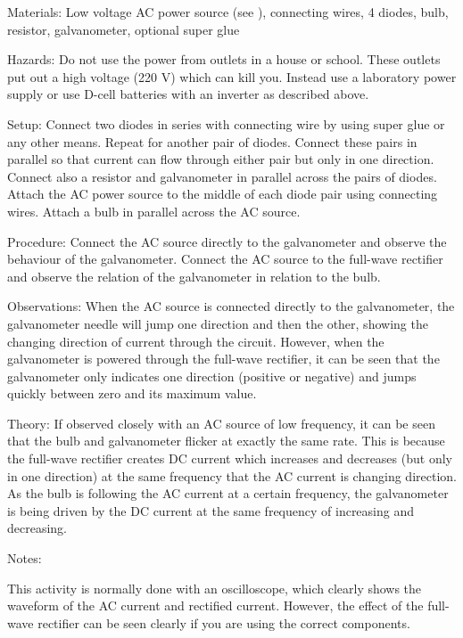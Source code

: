 \begin{multicols}{2}
\begin{description*}
\item[Materials:]{Low voltage AC power source (see ), connecting wires, 4 diodes, bulb, resistor, galvanometer, optional super glue}
\item[Hazards:]{Do not use the power from outlets in a house or school.  These outlets put out a high voltage (220 V) which can kill you.  Instead use a laboratory power supply or use D-cell batteries with an inverter as described above.}
\item[Setup:]{Connect two diodes in series with connecting wire by using super glue or any other means. Repeat for another pair of diodes. Connect these pairs in parallel so that current can flow through either pair but only in one direction. Connect also a resistor and galvanometer in parallel across the pairs of diodes. Attach the AC power source to the middle of each diode pair using connecting wires. Attach a bulb in parallel across the AC source.}
\item[Procedure:]{Connect the AC source directly to the galvanometer and observe the behaviour of the galvanometer. Connect the AC source to the full-wave rectifier and observe the relation of the galvanometer in relation to the bulb.}
\item[Observations:]{When the AC source is connected directly to the galvanometer, the galvanometer needle will jump one direction and then the other, showing the changing direction of current through the circuit.  However, when the galvanometer is powered through the full-wave rectifier, it can be seen that the galvanometer only indicates one direction (positive or negative) and jumps quickly between zero and its maximum value.}
\item[Theory:]{If observed closely with an AC source of low frequency, it can be seen that the bulb and galvanometer flicker at exactly the same rate.  This is because the full-wave rectifier creates DC current which increases and decreases (but only in one direction) at the same frequency that the AC current is changing direction.  As the bulb is following the AC current at a certain frequency, the galvanometer is being driven by the DC current at the same frequency of increasing and decreasing.}
\item[Notes:]{This activity is normally done with an oscilloscope, which clearly shows the waveform of the AC current and rectified current.  However, the effect of the full-wave rectifier can be seen clearly if you are using the correct components.

}
\end{description*}
\end{multicols}
